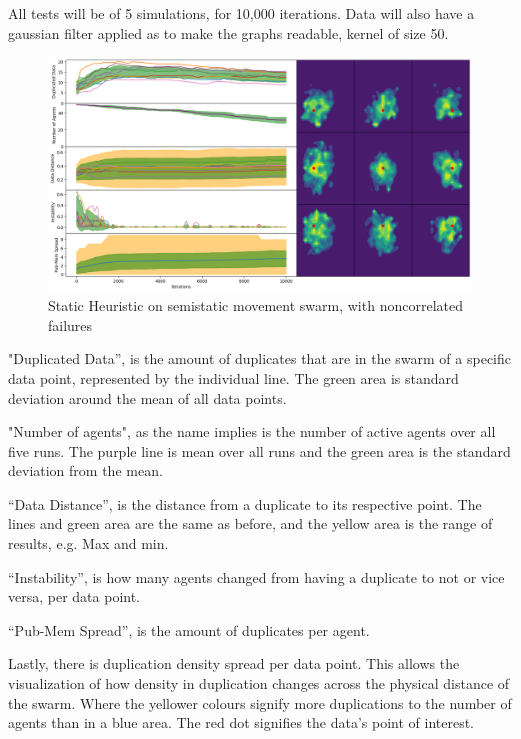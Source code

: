 \documentclass{UoYCSproject}
\begin{document}
All tests will be of 5 simulations, for 10,000 iterations. 
Data will also have a gaussian filter applied as to make the graphs readable, kernel of size 50. 

\begin{figure}[htb]
\label{fig:static_movement_non}
\begin{center}
\centering
\includegraphics[width=\linewidth]{"./Static_Heuristic/Static_Movement_non.png"}
\caption{Static Heuristic on semi\-static movement swarm, with non\-correlated failures}
\end{center}
\end{figure}

"Duplicated Data”, is the amount of duplicates that are in the swarm of a specific data point, represented by the individual line. 
The green area is standard deviation around the mean of all data points.

"Number of agents", as the name implies is the number of active agents over all five runs.
The purple line is mean over all runs and the green area is the standard deviation from the mean.

“Data Distance”, is the distance from a duplicate to its respective point. 
The lines and green area are the same as before, and the yellow area is the range of results, e.g. Max and min.

“Instability”, is how many agents changed from having a duplicate to not or vice versa, per data point.

“Pub-Mem Spread”, is the amount of duplicates per agent.

Lastly, there is duplication density spread per data point. 
This allows the visualization of how density in duplication changes across the physical distance of the swarm. 
Where the yellower colours signify more duplications to the number of agents than in a blue area. 
The red dot signifies the data’s point of interest.
\end{document}
